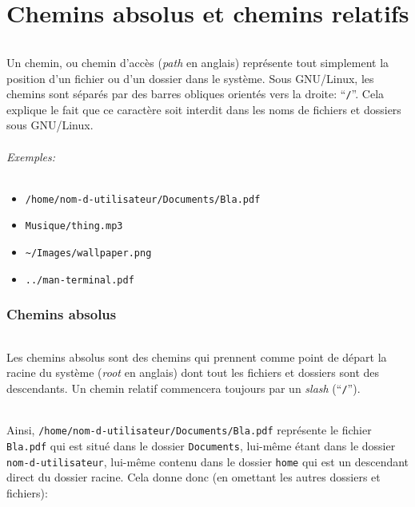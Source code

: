 \documentclass[french, a4paper, 12pt, titlepage]{article}
\begin{document}
\part{Chemins absolus et chemins relatifs}

\paragraph{} Un chemin, ou chemin d'accès (\emph{path} en anglais) représente
tout simplement la position d'un fichier ou d'un dossier dans le système. Sous
GNU/Linux, les chemins sont séparés par des barres obliques orientés vers la
droite: ``\texttt{/}''.  Cela explique le fait que ce caractère soit interdit
dans les noms de fichiers et dossiers sous GNU/Linux.

\paragraph{Exemples:}

\begin{itemize}
	\item \texttt{/home/nom-d-utilisateur/Documents/Bla.pdf}
	\item \texttt{Musique/thing.mp3}
	\item \texttt{\~{}/Images/wallpaper.png}
	\item \texttt{../man-terminal.pdf}
\end{itemize}

\section{Chemins absolus}

\paragraph{} Les chemins absolus sont des chemins qui prennent comme point de
départ la racine du système (\emph{root} en anglais) dont tout les fichiers et
dossiers sont des descendants. Un chemin relatif commencera toujours par un
\emph{slash} (``\texttt{/}'').

\paragraph{} Ainsi, \texttt{/home/nom-d-utilisateur/Documents/Bla.pdf}
représente le fichier \texttt{Bla.pdf} qui est situé dans le dossier
\texttt{Documents}, lui-même étant dans le dossier \texttt{nom-d-utilisateur},
lui-même contenu dans le dossier \texttt{home} qui est un descendant direct du
dossier racine. Cela donne donc (en omettant les autres dossiers et fichiers):
\\
\end{document}
